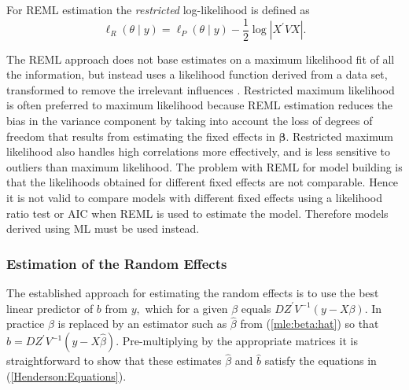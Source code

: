 \documentclass[12pt, a4paper]{report}
\theoremstyle{plain}
\theoremstyle{definition}
\theoremstyle{remark}
\begin{document}
			For REML estimation the \emph{restricted} log-likelihood is defined as
			\[
			\ell_R(\theta \mid y) =
			\ell_P(\theta \mid y) -\frac{1}{2} \log |X^\prime VX |.
			\]
			
			The REML approach does not base estimates on a maximum likelihood fit of all the information, but instead uses a likelihood function derived from a data set, transformed to remove the irrelevant influences \citep{REMLDefine}.
			Restricted maximum likelihood is often preferred to maximum likelihood because REML estimation reduces the bias in the variance component by taking into account the loss of degrees of freedom that results
			from estimating the fixed effects in $\boldsymbol{\beta}$. Restricted maximum likelihood also handles high correlations more effectively, and is less sensitive to outliers than maximum likelihood.  The problem with REML for model building is that the likelihoods obtained for different fixed effects are not comparable. Hence it is not valid to compare models with different fixed effects using a likelihood ratio test or AIC when REML is used to
			estimate the model. Therefore models derived using ML must be used instead.
			
			\subsubsection{Estimation of the Random Effects}
			
			The established approach for estimating the random effects is to use the best linear predictor of $b$ from $y,$ which for a given $\beta$ equals $DZ^\prime V^{-1}(y - X \beta).$ In practice $\beta$ is replaced by an estimator such as $\hat{\beta}$ from (\ref{mle:beta:hat}) so that $\hat{b} = DZ^\prime V^{-1}(y - X \hat{\beta}).$ Pre-multiplying by the appropriate matrices it is straightforward to show that these estimates $\hat{\beta}$ and $\hat{b}$ satisfy the equations in (\ref{Henderson:Equations}).
			
\end{document}
